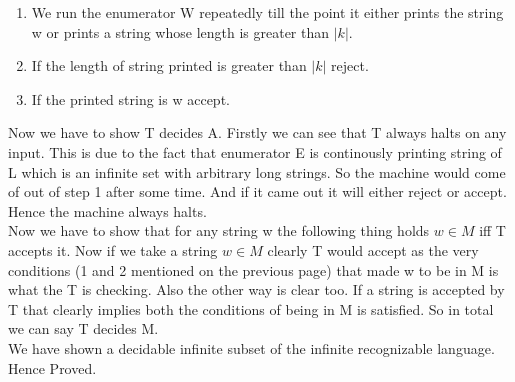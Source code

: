 \documentclass{article}
\begin{document}
\begin{enumerate}
    \item We run the enumerator W repeatedly till the point it either prints the string w or prints a string whose length is greater than $|k|$.
    \item If the length of string printed is greater than $|k|$ reject. 
    \item If the printed string is w accept.
\end{enumerate}
Now we have to show T decides A. Firstly we can see that T always halts on any input. This is due to the fact that enumerator E is continously printing string of L which is an infinite set with arbitrary long strings. So the machine would come of out of step 1 after some time. And if it came out it will either reject or accept. Hence the machine always halts.\\
Now we have to show that for any string w the following thing holds $w \in M$ iff T accepts it. Now if we take a string $w \in M$ clearly T would accept as the very conditions (1 and 2 mentioned on the previous page) that made w to be in M is what the T is checking. Also the other way is clear too. If a string is accepted by T that clearly implies both the conditions of being in M is satisfied. So in total we can say T decides M.\\
We have shown  a decidable infinite subset of the infinite recognizable language. 
Hence Proved.

\pagebreak
\end{document}
